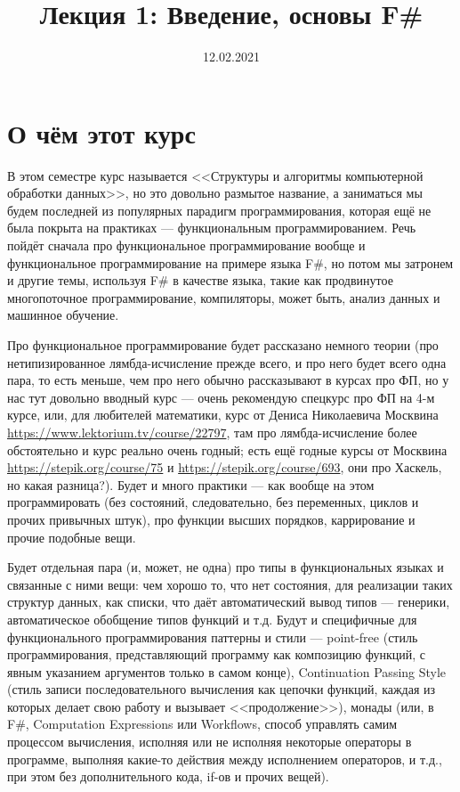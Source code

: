 \documentclass[a5paper]{article}
\title{Лекция 1: Введение, основы F\#}
\date{12.02.2021}
\begin{document}
\maketitle
\thispagestyle{empty}

\section{О чём этот курс}

В этом семестре курс называется <<Структуры и алгоритмы компьютерной обработки данных>>, но это довольно размытое название, а заниматься мы будем последней из популярных парадигм программирования, которая ещё не была покрыта на практиках --- функциональным программированием. Речь пойдёт сначала про функциональное программирование вообще и функциональное программирование на примере языка F\#, но потом мы затронем и другие темы, используя F\# в качестве языка, такие как продвинутое многопоточное программирование, компиляторы, может быть, анализ данных и машинное обучение.

Про функциональное программирование будет рассказано немного теории (про нетипизированное лямбда-исчисление прежде всего, и про него будет всего одна пара, то есть меньше, чем про него обычно рассказывают в курсах про ФП, но у нас тут довольно вводный курс --- очень рекомендую спецкурс про ФП на 4-м курсе, или, для любителей математики, курс от Дениса Николаевича Москвина \url{https://www.lektorium.tv/course/22797}, там про лямбда-исчисление более обстоятельно и курс реально очень годный; есть ещё годные курсы от Москвина \url{https://stepik.org/course/75} и \url{https://stepik.org/course/693}, они про Хаскель, но какая разница?). Будет и много практики --- как вообще на этом программировать (без состояний, следовательно, без переменных, циклов и прочих привычных штук), про функции высших порядков, каррирование и прочие подобные вещи.

Будет отдельная пара (и, может, не одна) про типы в функциональных языках и связанные с ними вещи: чем хорошо то, что нет состояния, для реализации таких структур данных, как списки, что даёт автоматический вывод типов --- генерики, автоматическое обобщение типов функций и т.д. Будут и специфичные для функционального программирования паттерны и стили --- point-free (стиль программирования, представляющий программу как композицию функций, с явным указанием аргументов только в самом конце), Continuation Passing Style (стиль записи последовательного вычисления как цепочки функций, каждая из которых делает свою работу и вызывает <<продолжение>>), монады (или, в F\#, Computation Expressions или Workflows, способ управлять самим процессом вычисления, исполняя или не исполняя некоторые операторы в программе, выполняя какие-то действия между исполнением операторов, и т.д., при этом без дополнительного кода, if-ов и прочих вещей).
\end{document}
